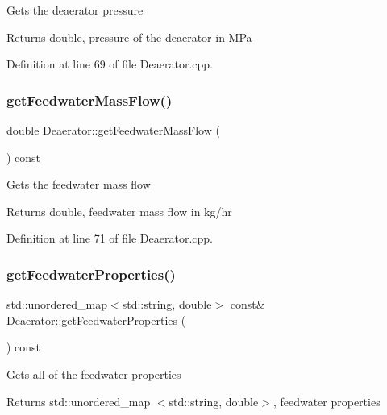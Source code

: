 Gets the deaerator pressure \begin{DoxyReturn}{Returns}
double, pressure of the deaerator in M\+Pa 
\end{DoxyReturn}


Definition at line 69 of file Deaerator.\+cpp.

\mbox{\label{class_deaerator_ae1524e8b406c3d5c2823ae4e6bafe389}} 
\subsubsection{\texorpdfstring{get\+Feedwater\+Mass\+Flow()}{getFeedwaterMassFlow()}}
{\footnotesize\ttfamily double Deaerator\+::get\+Feedwater\+Mass\+Flow (\begin{DoxyParamCaption}{ }\end{DoxyParamCaption}) const}

Gets the feedwater mass flow \begin{DoxyReturn}{Returns}
double, feedwater mass flow in kg/hr 
\end{DoxyReturn}


Definition at line 71 of file Deaerator.\+cpp.

\mbox{\label{class_deaerator_a74f7916b125f4964b0f534940f590633}} 
\subsubsection{\texorpdfstring{get\+Feedwater\+Properties()}{getFeedwaterProperties()}}
{\footnotesize\ttfamily std\+::unordered\+\_\+map$<$std\+::string, double$>$ const\& Deaerator\+::get\+Feedwater\+Properties (\begin{DoxyParamCaption}{ }\end{DoxyParamCaption}) const\hspace{0.3cm}{\ttfamily [inline]}}

Gets all of the feedwater properties \begin{DoxyReturn}{Returns}
std\+::unordered\+\_\+map $<$std\+::string, double$>$, feedwater properties 
\end{DoxyReturn}


